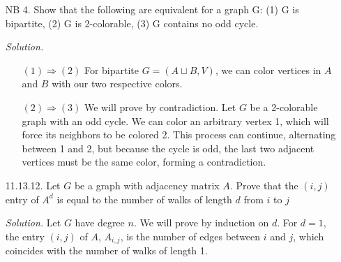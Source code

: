 \documentclass[11pt,letterpaper]{article}
\newenvironment{solution}{\color{Violet}\textit{Solution.}}{\color{black}}
\begin{document}
\begin{enumerate}
\begin{solution}
\begin{enumerate}
\begin{enumerate}
                \item Four connecting edges are in the cycle: 
                WLOG let $(a_0,a_5)$ be the edge that is \textit{not} in the cycle, forcing the other edges containing $a_0$ and $a_5$, i.e. $(a_5,a_6)$, $(a_5,a_9)$, $(a_0,a_2)$, and $(a_0,a_3)$, to be in the cycle. Additionally, because two edges already contain $a_6$, the edge $(a_6,a_7)$ \textit{cannot} be in the cycle. This forces the other edge containing $a_7$, i.e. $(a_7,a_8)$, to be in the cycle. However, we now have a 5-cycle between $a_0$, $a_2$, $a_7$, $a_8$, and $a_3$ which is not possible within our Hamiltonian cycle.
            \end{enumerate}
            \item[(2)] 
            To show $P$ is not planar, construct a minor by contracting the edges $(a_0,a_5)$, $(a_1,a_6)$, $(a_2,a_7)$, $(a_3,a_8)$, and $(a_4,a_9)$, resulting in $K_5$. By Kuratowski's Theorem, $P$ is not planar.
        \end{enumerate}
    \end{solution}
    

    \item[NB 4.] Show that the following are equivalent for a graph G:  (1) G is bipartite, (2) G is 2-colorable, (3) G contains no odd cycle.  

    \begin{solution}
        \begin{enumerate}
            \item[$(1)\Rightarrow(2)$] For bipartite $G=(A\sqcup B, V)$, we can color vertices in $A$ and $B$ with our two respective colors.
            \item[$(2)\Rightarrow(3)$] We will prove by contradiction. Let $G$ be a 2-colorable graph with an odd cycle. We can color an arbitrary vertex 1, which will force its neighbors to be colored 2. This process can continue, alternating between 1 and 2, but because the cycle is odd, the last two adjacent vertices must be the same color, forming a contradiction.
        \end{enumerate}
    \end{solution}

    \item[11.13.12.] Let $G$ be a graph with adjacency matrix $A$. Prove that the $(i,j)$ entry of $A^d$ is equal to the number of walks of length $d$ from $i$ to $j$
    
    \begin{solution}
        Let $G$ have degree $n$. We will prove by induction on $d$. For $d=1$, the entry $(i,j)$ of $A$, $A_{i,j}$, is the number of edges between $i$ and $j$, which coincides with the number of walks of length 1.


\end{solution}
\end{enumerate}
\end{document}
